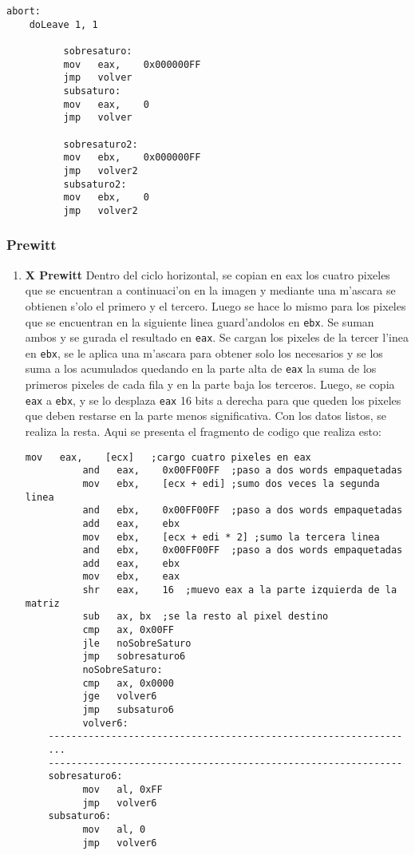 \documentclass[11pt]{article}
\begin{document}
\begin{enumerate}
\begin{lstlisting}[frame=single]
	abort:
	doLeave 1, 1

	      sobresaturo:
	      mov	eax,	0x000000FF
	      jmp	volver
	      subsaturo:
	      mov	eax,	0
	      jmp	volver

	      sobresaturo2:
	      mov	ebx,	0x000000FF
	      jmp	volver2
	      subsaturo2:
	      mov	ebx,	0
	      jmp	volver2
\end{lstlisting}

\subsubsection{Prewitt} 
\begin{enumerate}
\item \textbf{X Prewitt}
\subitem Dentro del ciclo horizontal, se copian en eax los cuatro pixeles que se encuentran a continuaci'on en la imagen y mediante una m'ascara se obtienen s'olo el primero y el tercero. Luego se hace lo mismo para los pixeles que se encuentran en la siguiente linea guard'andolos en \verb'ebx'. Se suman ambos y se gurada el resultado en \verb'eax'.
Se cargan los pixeles de la tercer l'inea en \verb'ebx', se le aplica una m'ascara para obtener solo los necesarios y se los suma a los acumulados quedando en la parte alta de \verb'eax' la suma de los primeros pixeles de cada fila y en la parte baja los terceros. Luego, se copia  \verb'eax' a \verb'ebx', y se lo desplaza \verb'eax' 16 bits a derecha para que queden los pixeles que deben restarse en la parte menos significativa.
Con los datos listos, se realiza la resta. Aqui se presenta el fragmento de codigo que realiza esto:
\begin{lstlisting}[frame=single]
	      mov	eax,	[ecx]	;cargo cuatro pixeles en eax
	      and	eax,	0x00FF00FF	;paso a dos words empaquetadas
	      mov	ebx,	[ecx + edi]	;sumo dos veces la segunda linea
	      and	ebx,	0x00FF00FF	;paso a dos words empaquetadas
	      add	eax,	ebx
	      mov	ebx,	[ecx + edi * 2]	;sumo la tercera linea
	      and	ebx,	0x00FF00FF	;paso a dos words empaquetadas
	      add	eax,	ebx
	      mov	ebx,	eax
	      shr	eax,	16	;muevo eax a la parte izquierda de la matriz
	      sub	ax,	bx	;se la resto al pixel destino
	      cmp	ax,	0x00FF
	      jle	noSobreSaturo
	      jmp	sobresaturo6
	      noSobreSaturo:
	      cmp	ax,	0x0000
	      jge	volver6
	      jmp	subsaturo6
	      volver6:
	--------------------------------------------------------------
	...
	--------------------------------------------------------------
	sobresaturo6:
	      mov	al,	0xFF
	      jmp	volver6
	subsaturo6:
	      mov	al,	0
	      jmp	volver6


\end{lstlisting}
\end{enumerate}
\end{enumerate}
\end{document}
